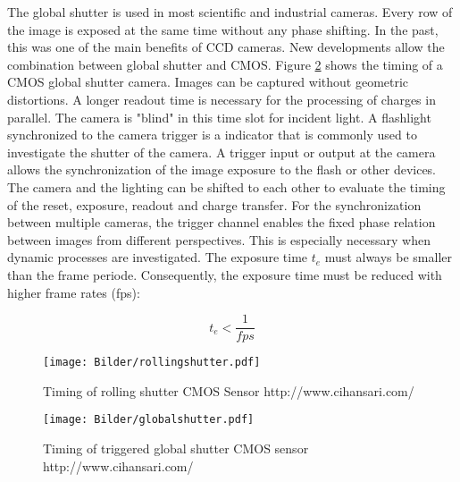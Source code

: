  The global shutter is used in most scientific and industrial cameras. Every row of the image is exposed at the same time without any phase shifting. In the past, this was one of the main benefits of CCD cameras. New developments allow the combination between global shutter and CMOS. Figure \ref{fig:Global_shutter} shows the timing of a CMOS global shutter camera. Images can be captured without geometric distortions. A longer readout time is necessary for the processing of charges in parallel. The camera is "blind" in this time slot for incident light. A flashlight synchronized to the camera trigger is a indicator that is commonly used to investigate the shutter of the camera. A trigger input or output at the camera allows the synchronization of the image exposure to the flash or other devices. The camera and the lighting can be shifted to each other to evaluate the timing of the reset, exposure, readout and charge transfer. For the synchronization between multiple cameras, the trigger channel enables the fixed phase relation between images from different perspectives. This is especially necessary when dynamic processes are investigated. The exposure time $t_e$ must always be smaller than the frame periode. Consequently, the exposure time must be reduced with higher frame rates (fps):
 
 \begin{equation}
 t_e < \frac{1}{fps}
 \end{equation}
 \medskip

\begin{figure} [!h]
	\centering
	\texttt{[image: Bilder/rollingshutter.pdf]}
	\caption{Timing of rolling shutter CMOS Sensor \tiny http://www.cihansari.com/}
	\label{fig:Rolling_shutter}
\end{figure} 

\begin{figure} [!h]
	\centering
	\texttt{[image: Bilder/globalshutter.pdf]}
	\caption{Timing of triggered global shutter CMOS sensor \tiny http://www.cihansari.com/}
	\label{fig:Global_shutter}
\end{figure}  

